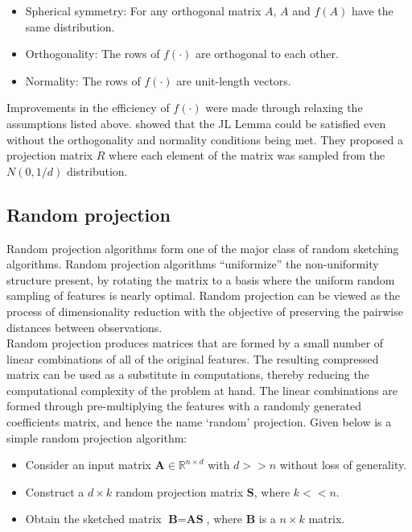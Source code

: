 \begin{itemize}
\item Spherical symmetry: For any orthogonal matrix $A$, $A$ and $f(A)$ have the same distribution.
\item Orthogonality: The rows of $f(\cdot)$ are orthogonal to each other.
\item Normality: The rows of $f(\cdot)$ are unit-length vectors.
\end{itemize}

Improvements in the efficiency of $f(\cdot)$ were made through relaxing the assumptions listed above. \cite{har-peled_approximate_2012}  showed that the JL Lemma could be satisfied even without the  orthogonality and normality conditions being met. They proposed a projection matrix $R$ where each element of the matrix was sampled from the $N(0, 1/d)$ distribution. \\

\subsection{Random projection}

Random projection algorithms form one of the major class of random sketching algorithms. Random projection algorithms “uniformize” the non-uniformity structure present, by rotating the matrix to a basis where the uniform random sampling of features is nearly optimal. Random projection can be viewed as the process of dimensionality reduction with the objective of preserving the pairwise distances between observations. \\

Random projection produces matrices that are formed by a small number of linear combinations of all of the original features. The resulting compressed matrix can be used as a substitute in computations, thereby reducing the computational complexity of the problem at hand. The linear combinations are formed through pre-multiplying the features with a randomly generated coefficients matrix, and hence the name `random' projection. Given below is a simple random projection algorithm: 

\begin{itemize}
\item Consider an input matrix $\textbf{A} \in \mathds{R}^{n\times d}$ with $d >> n$ without loss of generality.
\item Construct a $d \times k$ random projection matrix $\textbf{S}$, where $k << n$.
\item Obtain the sketched matrix $\textbf{B}= \textbf{A}\textbf{S}$, where $\textbf{B}$ is a $n \times k$ matrix. 
\end{itemize}

